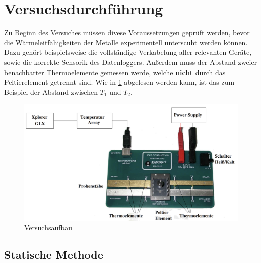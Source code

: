 


\section{Versuchsdurchführung}
\label{sec:Versuchsdurchführung}

Zu Beginn des Versuches müssen divese Voraussetzungen geprüft werden, bevor die Wärmeleitfähigkeiten der Metalle experimentell unterscuht werden können.
Dazu gehört beispielsweise die vollständige Verkabelung aller relevanten Geräte, sowie die korrekte Sensorik des Datenloggers. Außerdem muss der Abstand 
zweier benachbarter Thermoelemente gemessen werde, welche \textbf{nicht} durch das Peltierelement getrennt sind. Wie in \ref{fig:Versuchsaufbau} abgelesen werden kann,
ist das zum Beispiel der Abstand zwischen $T_1$ und $T_2$. 

\begin{figure}
    \centering
    \includegraphics[width=\textwidth]{Versuchsaufbau_v204.png}
    \caption{Versuchsaufbau}
    \label{fig:Versuchsaufbau}
\end{figure}

\subsection{Statische Methode}
\label{sec:Statische Methode}

